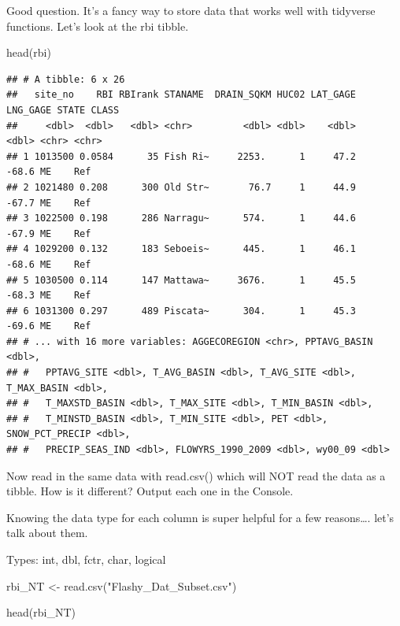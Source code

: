 \documentclass[
]{book}
\newenvironment{Shaded}{\begin{snugshade}}{\end{snugshade}}
\newcommand{\FunctionTok}[1]{\textcolor[rgb]{0.00,0.00,0.00}{#1}}
\newcommand{\NormalTok}[1]{#1}
\newcommand{\OtherTok}[1]{\textcolor[rgb]{0.56,0.35,0.01}{#1}}
\newcommand{\StringTok}[1]{\textcolor[rgb]{0.31,0.60,0.02}{#1}}
\begin{document}
Good question. It's a fancy way to store data that works well with tidyverse functions. Let's look at the rbi tibble.

\begin{Shaded}
\begin{Highlighting}[]
\FunctionTok{head}\NormalTok{(rbi)}
\end{Highlighting}
\end{Shaded}

\begin{verbatim}
## # A tibble: 6 x 26
##   site_no    RBI RBIrank STANAME  DRAIN_SQKM HUC02 LAT_GAGE LNG_GAGE STATE CLASS
##     <dbl>  <dbl>   <dbl> <chr>         <dbl> <dbl>    <dbl>    <dbl> <chr> <chr>
## 1 1013500 0.0584      35 Fish Ri~     2253.      1     47.2    -68.6 ME    Ref  
## 2 1021480 0.208      300 Old Str~       76.7     1     44.9    -67.7 ME    Ref  
## 3 1022500 0.198      286 Narragu~      574.      1     44.6    -67.9 ME    Ref  
## 4 1029200 0.132      183 Seboeis~      445.      1     46.1    -68.6 ME    Ref  
## 5 1030500 0.114      147 Mattawa~     3676.      1     45.5    -68.3 ME    Ref  
## 6 1031300 0.297      489 Piscata~      304.      1     45.3    -69.6 ME    Ref  
## # ... with 16 more variables: AGGECOREGION <chr>, PPTAVG_BASIN <dbl>,
## #   PPTAVG_SITE <dbl>, T_AVG_BASIN <dbl>, T_AVG_SITE <dbl>, T_MAX_BASIN <dbl>,
## #   T_MAXSTD_BASIN <dbl>, T_MAX_SITE <dbl>, T_MIN_BASIN <dbl>,
## #   T_MINSTD_BASIN <dbl>, T_MIN_SITE <dbl>, PET <dbl>, SNOW_PCT_PRECIP <dbl>,
## #   PRECIP_SEAS_IND <dbl>, FLOWYRS_1990_2009 <dbl>, wy00_09 <dbl>
\end{verbatim}

Now read in the same data with read.csv() which will NOT read the data as a tibble. How is it different? Output each one in the Console.

Knowing the data type for each column is super helpful for a few reasons\ldots. let's talk about them.

Types: int, dbl, fctr, char, logical

\begin{Shaded}
\begin{Highlighting}[]
\NormalTok{rbi\_NT }\OtherTok{\textless{}{-}} \FunctionTok{read.csv}\NormalTok{(}\StringTok{"Flashy\_Dat\_Subset.csv"}\NormalTok{)}

\FunctionTok{head}\NormalTok{(rbi\_NT)}
\end{Highlighting}
\end{Shaded}
\end{document}
